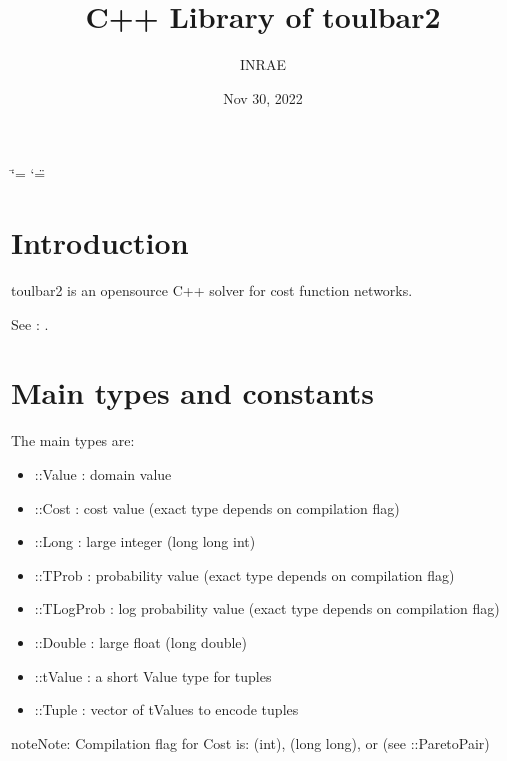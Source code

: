 \documentclass[letterpaper,10pt,openany,oneside,english]{sphinxmanual}
\title{C++ Library of toulbar2}
\date{Nov 30, 2022}
\author{INRAE}
\begin{document}
\ifdefined\shorthandoff
  \ifnum\catcode`\=\string=\active\shorthandoff{=}\fi
  \ifnum\catcode`\"=\active{}\fi
\fi

\pagestyle{empty}
\sphinxmaketitle
\pagestyle{plain}
\sphinxtableofcontents
\pagestyle{normal}
\label{\detokenize{ref/ref_cpp::doc}}



\chapter{Introduction}
\label{\detokenize{ref/ref_cpp:introduction}}
\sphinxAtStartPar
toulbar2 is an open\sphinxhyphen{}source C++ solver for cost function networks.

\sphinxAtStartPar
See : .


\chapter{Main types and constants}
\label{\detokenize{ref/ref_cpp:main-types-and-constants}}
\sphinxAtStartPar
The main types are:\begin{itemize}
\item {} 
\sphinxAtStartPar
::Value : domain value

\item {} 
\sphinxAtStartPar
::Cost : cost value (exact type depends on compilation flag)

\item {} 
\sphinxAtStartPar
::Long : large integer (long long int)

\item {} 
\sphinxAtStartPar
::TProb : probability value (exact type depends on compilation flag)

\item {} 
\sphinxAtStartPar
::TLogProb : log probability value (exact type depends on compilation flag)

\item {} 
\sphinxAtStartPar
::Double : large float (long double)

\item {} 
\sphinxAtStartPar
::tValue : a short Value type for tuples

\item {} 
\sphinxAtStartPar
::Tuple : vector of tValues to encode tuples

\end{itemize}


\begin{sphinxadmonition}{note}{Note:}
\sphinxAtStartPar
Compilation flag for Cost is:  (int),  (long long), or  (see ::ParetoPair) 
\end{sphinxadmonition}
\end{document}
